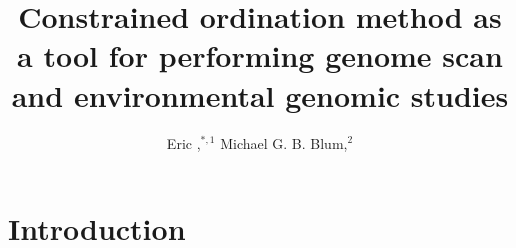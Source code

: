 \documentclass[nogrid]{MBE}%
\begin{document}
\title[Constrained ordination for environmental genomics]{Constrained ordination method as a tool for performing genome scan and environmental genomic studies}


\author[Bazin et al.]{Eric ,$^{\ast,1}$ Michael G. B.
Blum,$^{2}$}

\address{$^{1}$LECA, Universit\'{e} de Grenoble\\
$^{2}$TIMC, Universit\'{e} de Grenoble}


\history{}


\datade{}


\editor{}

\abstract{
}

\keyword{}

\maketitle



\section{{Introduction}\label{sec:Intro}}
\end{document}
